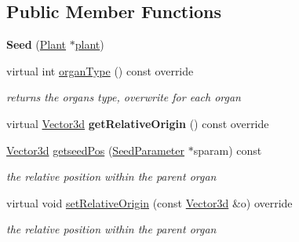 \subsection*{Public Member Functions}
\begin{DoxyCompactItemize}
\item 
\mbox{\label{classCPlantBox_1_1Seed_a49db517a941122aa79df6ba8434ee141}} 
{\bfseries Seed} (\hyperlink{classCPlantBox_1_1Plant}{Plant} $\ast$\hyperlink{classCPlantBox_1_1Organ_ac614456886ab270c6fd2617403e0f306}{plant})
\item 
\mbox{\label{classCPlantBox_1_1Seed_ab9e6531b8ab252af9c0b2da83ae98972}} 
virtual int \hyperlink{classCPlantBox_1_1Seed_ab9e6531b8ab252af9c0b2da83ae98972}{organ\+Type} () const override
\begin{DoxyCompactList}\small\item\em returns the organs type, overwrite for each organ \end{DoxyCompactList}\item 
\mbox{\label{classCPlantBox_1_1Seed_a377d61d05f475309ea482f5ec381e639}} 
virtual \hyperlink{classCPlantBox_1_1Vector3d}{Vector3d} {\bfseries get\+Relative\+Origin} () const override
\item 
\mbox{\label{classCPlantBox_1_1Seed_a983f6a136c582505b960472561562639}} 
\hyperlink{classCPlantBox_1_1Vector3d}{Vector3d} \hyperlink{classCPlantBox_1_1Seed_a983f6a136c582505b960472561562639}{getseed\+Pos} (\hyperlink{classCPlantBox_1_1SeedParameter}{Seed\+Parameter} $\ast$sparam) const
\begin{DoxyCompactList}\small\item\em the relative position within the parent organ \end{DoxyCompactList}\item 
\mbox{\label{classCPlantBox_1_1Seed_ac0c7819ea4ffe0d425908fd52b76efba}} 
virtual void \hyperlink{classCPlantBox_1_1Seed_ac0c7819ea4ffe0d425908fd52b76efba}{set\+Relative\+Origin} (const \hyperlink{classCPlantBox_1_1Vector3d}{Vector3d} \&o) override
\begin{DoxyCompactList}\small\item\em the relative position within the parent organ \end{DoxyCompactList}\item 

\end{DoxyCompactItemize}
